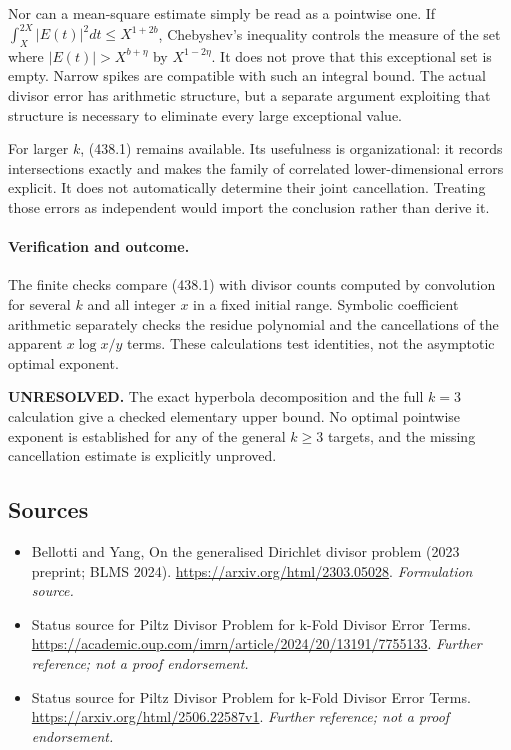 \documentclass[11pt]{article}
\begin{document}
Nor can a mean-square estimate simply be read as a pointwise one. If $\int_X^{2X}|E(t)|^2dt\le X^{1+2b}$, Chebyshev's inequality controls the measure of the set where $|E(t)|>X^{b+\eta}$ by $X^{1-2\eta}$. It does not prove that this exceptional set is empty. Narrow spikes are compatible with such an integral bound. The actual divisor error has arithmetic structure, but a separate argument exploiting that structure is necessary to eliminate every large exceptional value.

For larger $k$, (438.1) remains available. Its usefulness is organizational: it records intersections exactly and makes the family of correlated lower-dimensional errors explicit. It does not automatically determine their joint cancellation. Treating those errors as independent would import the conclusion rather than derive it.

\paragraph{Verification and outcome.}
The finite checks compare (438.1) with divisor counts computed by convolution for several $k$ and all integer $x$ in a fixed initial range. Symbolic coefficient arithmetic separately checks the residue polynomial and the cancellations of the apparent $x\log x/y$ terms. These calculations test identities, not the asymptotic optimal exponent.

\textbf{UNRESOLVED.} The exact hyperbola decomposition and the full $k=3$ calculation give a checked elementary upper bound. No optimal pointwise exponent is established for any of the general $k\ge3$ targets, and the missing cancellation estimate is explicitly unproved.

\subsection{Sources}
\begin{itemize}
\item[S1]Bellotti and Yang, On the generalised Dirichlet divisor problem (2023 preprint; BLMS 2024).
\url{https://arxiv.org/html/2303.05028}.
\textit{Formulation source.}
\item[S2]Status source for Piltz Divisor Problem for k-Fold Divisor Error Terms.
\url{https://academic.oup.com/imrn/article/2024/20/13191/7755133}.
\textit{Further reference; not a proof endorsement.}
\item[S3]Status source for Piltz Divisor Problem for k-Fold Divisor Error Terms.
\url{https://arxiv.org/html/2506.22587v1}.
\textit{Further reference; not a proof endorsement.}
\end{itemize}
\end{document}
